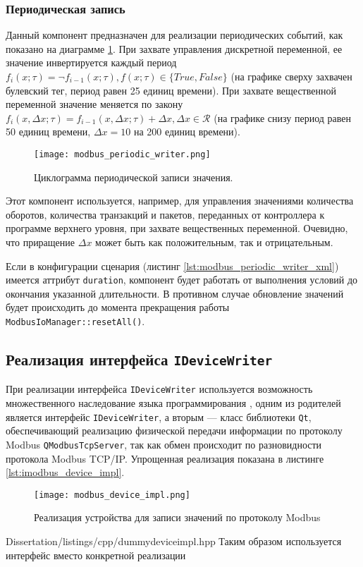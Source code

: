 \subsubsection{Периодическая запись}
Данный компонент предназначен для реализации периодических событий, как показано на диаграмме \ref{fig:modbus_periodic_writer}.
При захвате управления дискретной переменной, ее значение инвертируется каждый период
$f_i(x; \tau) = \lnot f_{i-1}(x; \tau), f(x; \tau) \in \{True, False\}$
(на графике сверху захвачен булевский тег, период равен 25 единиц времени).
При захвате вещественной переменной значение меняется по закону
$f_i(x,\Delta x; \tau) = f_{i-1}(x,\Delta x; \tau) + \Delta x, \Delta x \in \mathcal{R}$
(на графике снизу период равен 50 единиц времени, $\Delta x = 10$ на 200 единиц времени).
\begin{center}
    \begin{figure}[h!]
        \texttt{[image: modbus\_periodic\_writer.png]}
        \caption{Циклограмма периодической записи значения.}\label{fig:modbus_periodic_writer}
    \end{figure}
\end{center}
Этот компонент используется, например, для управления значениями количества оборотов,
количества транзакций и пакетов, переданных от контроллера к программе верхнего уровня,
при захвате вещественных переменной.
Очевидно, что приращение $\Delta x$ может быть как положительным, так и отрицательным.

Если в конфигурации сценария (листинг \ref{lst:modbus_periodic_writer_xml}) имеется аттрибут
\texttt{duration}, компонент будет работать от выполнения условий до окончания указанной длительности.
В противном случае обновление значений будет происходить до момента прекращения работы
\texttt{ModbusIoManager::resetAll()}.


\subsection{Реализация интерфейса \texttt{IDeviceWriter}}
При реализации интерфейса \texttt{IDeviceWriter} используется возможность множественного наследование языка программирования \cpp,
одним из родителей является интерфейс \texttt{IDeviceWriter},
а вторым --- класс библиотеки \texttt{Qt}, обеспечивающий реализацию физической передачи информации по протоколу Modbus
\texttt{QModbusTcpServer}, так как обмен происходит по разновидности протокола Modbus TCP/IP.
Упрощенная реализация показана в листинге \ref{lst:imodbus_device_impl}.
\begin{center}
    \begin{figure}
        \texttt{[image: modbus\_device\_impl.png]}
        \caption{Реализация устройства для записи значений по протоколу Modbus}\label{fig:modbus_device_imp}
    \end{figure}
\end{center}

        {Dissertation/listings/cpp/dummydeviceimpl.hpp}
Таким образом используется интерфейс вместо конкретной реализации \cite[стр. 47-48]{book:pattern:head_first}


